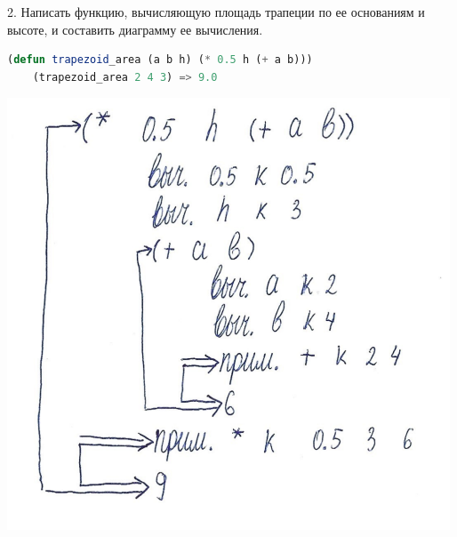\documentclass[12pt]{report}
\begin{document}
2. Написать функцию, вычисляющую площадь трапеции по ее основаниям и высоте, и составить диаграмму ее вычисления.

\begin{lstlisting}[language=Lisp]
	(defun trapezoid_area (a b h) (* 0.5 h (+ a b)))
	(trapezoid_area 2 4 3) => 9.0
\end{lstlisting}

\includegraphics[scale=1.2]{img/d2}

	
	
	
\end{document}
